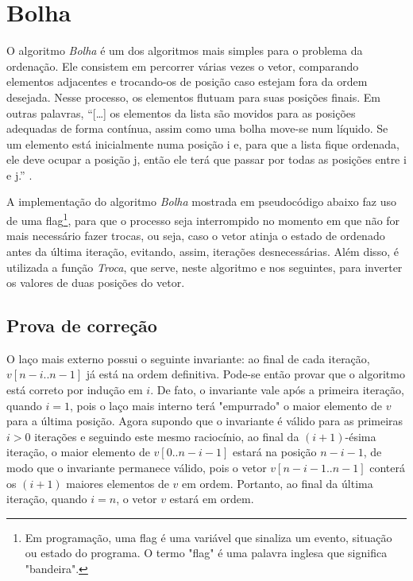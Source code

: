 \section{Bolha}
O algoritmo \textit{Bolha} é um dos algoritmos mais simples para o problema da ordenação. Ele consistem em percorrer várias vezes o vetor, comparando elementos adjacentes e trocando-os de posição caso estejam fora da ordem desejada. Nesse processo, os elementos flutuam para suas posições finais. Em outras palavras, ``[…]  os elementos da lista são movidos para as posições adequadas de forma contínua, assim como uma bolha move-se num líquido. Se um elemento está inicialmente numa posição i e, para que a lista fique ordenada, ele deve ocupar a posição j, então ele terá que passar por todas as posições entre i e j.'' \cite[p.8]{viana2011pesquisa}.

A implementação do algoritmo \textit{Bolha} mostrada em pseudocódigo abaixo faz uso de uma flag\footnote{Em programação, uma flag é uma variável que sinaliza um evento, situação ou estado do programa. O termo "flag" é uma palavra inglesa que significa "bandeira".}, para que o processo seja interrompido no momento em que não for mais necessário fazer trocas, ou seja, caso o vetor atinja o estado de ordenado antes da última iteração, evitando, assim, iterações desnecessárias. Além disso, é utilizada a função \textit{Troca}, que serve, neste algoritmo e nos seguintes, para inverter os valores de duas posições do vetor.



\subsection{Prova de correção}
O laço mais externo possui o seguinte invariante: ao final de cada iteração, $v[n-i..n-1]$ já está na ordem definitiva. Pode-se então provar que o algoritmo está correto por indução em $i$. De fato, o invariante vale após a primeira iteração, quando $i = 1$, pois o laço mais interno terá "empurrado" o maior elemento de $v$ para a última posição. Agora supondo que o invariante é válido para as primeiras $i > 0$ iterações e seguindo este mesmo raciocínio, ao final da $(i+1)$-ésima iteração, o maior elemento de $v[0..n-i-1]$ estará na posição $n-i-1$, de modo que o invariante permanece válido, pois o vetor $v[n-i-1..n-1]$ conterá os $(i+1)$ maiores elementos de $v$ em ordem. Portanto, ao final da última iteração, quando $i = n$, o vetor $v$ estará em ordem.

